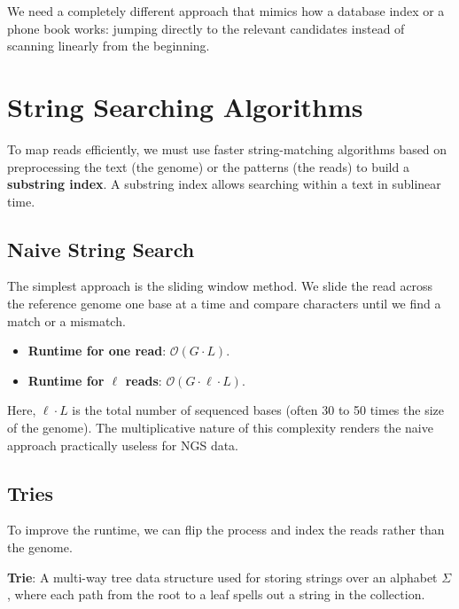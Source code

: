 We need a completely different approach that mimics how a database index or a phone book works: jumping directly to the relevant candidates instead of scanning linearly from the beginning. 

\section{String Searching Algorithms}

To map reads efficiently, we must use faster string-matching algorithms based on preprocessing the text (the genome) or the patterns (the reads) to build a \textbf{substring index}. A substring index allows searching within a text in sublinear time.

\subsection{Naive String Search}

The simplest approach is the sliding window method. We slide the read across the reference genome one base at a time and compare characters until we find a match or a mismatch.


\begin{itemize}
    \item \textbf{Runtime for one read}: $\mathcal{O}(G \cdot L)$.
    \item \textbf{Runtime for $\ell$ reads}: $\mathcal{O}(G \cdot \ell \cdot L)$.
\end{itemize}

Here, $\ell \cdot L$ is the total number of sequenced bases (often 30 to 50 times the size of the genome). The multiplicative nature of this complexity renders the naive approach practically useless for NGS data.

\subsection{Tries}

To improve the runtime, we can flip the process and index the reads rather than the genome.

\begin{important}
    \textbf{Trie}: A multi-way tree data structure used for storing strings over an alphabet $\Sigma$, where each path from the root to a leaf spells out a string in the collection.
\end{important}

